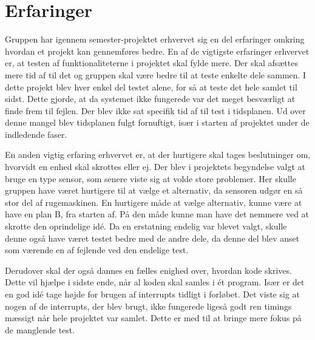\newpage
\section{Erfaringer}

Gruppen har igennem semester-projektet erhvervet sig en del erfaringer omkring hvordan et projekt kan gennemføres bedre.
En af de vigtigste erfaringer erhvervet er, at testen af funktionaliteterne i projektet skal fylde mere. Der skal afsættes mere tid af til det og gruppen skal være bedre til at teste enkelte dele sammen.
I dette projekt blev hver enkel del testet alene, for så at teste det hele samlet til sidst. Dette gjorde, at da systemet ikke fungerede var det meget besværligt at finde frem til fejlen.
Der blev ikke sat specifik tid af til test i tidsplanen. Ud over denne mangel blev tidsplanen fulgt fornuftigt, især i starten af projektet under de indledende faser. 

En anden vigtig erfaring erhvervet er, at der hurtigere skal tages beslutninger om, hvorvidt en enhed skal skrottes eller ej.
Der blev i projektets begyndelse valgt at bruge en type sensor, som senere viste sig at volde store problemer. Her skulle gruppen have været hurtigere til at vælge et alternativ, da sensoren udgør en så stor del af rugemaskinen.
En hurtigere måde at vælge alternativ, kunne være at have en plan B, fra starten af. På den måde kunne man have det nemmere ved at skrotte den oprindelige idé. 
Da en erstatning endelig var blevet valgt, skulle denne også have været testet bedre med de andre dele, da denne del blev anset som værende en af fejlende ved den endelige test.

Derudover skal der også dannes en fælles enighed over, hvordan kode skrives. Dette vil hjælpe i sidste ende, når al koden skal samles i ét program. 
Især er det en god idé tage højde for brugen af interrupts tidligt i forløbet. Det viste sig at nogen af de interrupts, der blev brugt, ikke fungerede ligeså godt ren timings mæssigt når hele projektet var samlet.
Dette er med til at bringe mere fokus på de manglende test. 


%
%
%
%
%
%
%